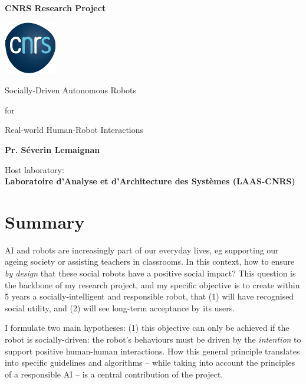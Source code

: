 \documentclass[12pt,a4paper]{article}
\title{\project}
\begin{document}
\begin{center}

    \textbf{\LARGE CNRS Research Project}

    \vspace{1cm}
    \includegraphics[width=0.2\linewidth]{CNRS.pdf}


    \vspace{3cm}
    {\Huge Socially-Driven Autonomous Robots}

    \vspace{0.5cm}
    {\LARGE for}

    \vspace{0.5cm}
    {\Huge Real-world Human-Robot Interactions}

    \vspace{2cm}
    {\LARGE\bf Pr. Séverin Lemaignan}

    \vspace{3cm}
    {\Large Host laboratory:\\ \bf Laboratoire d'Analyse et d'Architecture des Systèmes (LAAS-CNRS)}
\end{center}

    \vspace{3cm}

\newpage

\section*{Summary}\label{abstract}


AI and robots are increasingly part of our
everyday lives, eg supporting our ageing society or assisting teachers in
classrooms. In this context, how to ensure \emph{by design} that these social robots
have a positive social impact? This question is the backbone of my
research project, and my specific objective is to create within 5 years
a socially-intelligent and responsible robot, that (1) will have recognised
social utility, and (2) will see long-term acceptance by its users.

I formulate two main hypotheses: (1) this objective can only be achieved if the
robot is socially-driven: the robot's behaviours must be driven by the
\emph{intention} to support positive human-human interactions. How this general principle
translates into specific guidelines and algorithms -- while taking into account
the principles of a responsible AI -- is a central contribution of the project.
\end{document}
